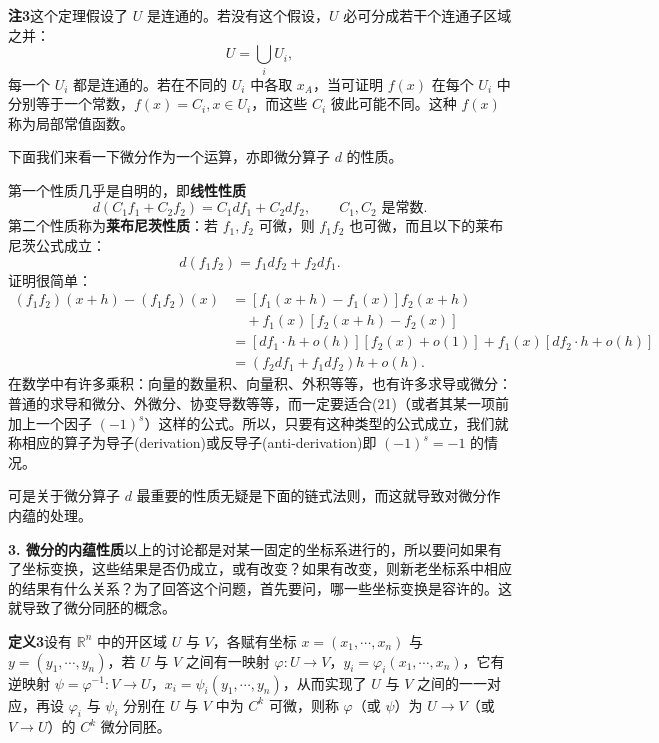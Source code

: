\noindent\textbf{注3}\quad 这个定理假设了 $U$ 是连通的。若没有这个假设，$U$ 必可分成若干个连通子区域之并：
\[
 U=\bigcup_i U_i,
\]
每一个 $U_i$ 都是连通的。若在不同的 $U_i$ 中各取 $x_A$，当可证明 $f(x)$ 在每个 $U_i$ 中分别等于一个常数，$f(x)=C_i,x\in U_i$，而这些 $C_i$ 彼此可能不同。这种 $f(x)$ 称为局部常值函数。

下面我们来看一下微分作为一个运算，亦即微分算子 $d$ 的性质。

第一个性质几乎是自明的，即\textbf{线性性质}
\begin{equation}
 d(C_1f_1+C_2f_2)=C_1df_1+C_2df_2,\qquad C_1,C_2\text{ 是常数}.
 \tag{20}
\end{equation}
第二个性质称为\textbf{莱布尼茨性质}：若 $f_1,f_2$ 可微，则 $f_1f_2$ 也可微，而且以下的莱布尼茨公式成立：
\begin{equation}
 d(f_1f_2)=f_1df_2+f_2df_1.
 \tag{21}
\end{equation}
证明很简单：
\begin{align*}
 (f_1f_2)(x+h)-(f_1f_2)(x)
 &= [f_1(x+h)-f_1(x)]f_2(x+h)\\
 &\quad+f_1(x)[f_2(x+h)-f_2(x)]\\
 &= [df_1\cdot h+o(h)][f_2(x)+o(1)]+f_1(x)[df_2\cdot h+o(h)]\\
 &= (f_2df_1+f_1df_2)h+o(h).
\end{align*}
在数学中有许多乘积：向量的数量积、向量积、外积等等，也有许多求导或微分：普通的求导和微分、外微分、协变导数等等，而一定要适合(21)（或者其某一项前加上一个因子 $(-1)^s$）这样的公式。所以，只要有这种类型的公式成立，我们就称相应的算子为导子(derivation)或反导子(anti-derivation)即 $(-1)^s=-1$ 的情况。

可是关于微分算子 $d$ 最重要的性质无疑是下面的链式法则，而这就导致对微分作内蕴的处理。

\noindent\textbf{3. 微分的内蕴性质}\quad 以上的讨论都是对某一固定的坐标系进行的，所以要问如果有了坐标变换，这些结果是否仍成立，或有改变？如果有改变，则新老坐标系中相应的结果有什么关系？为了回答这个问题，首先要问，哪一些坐标变换是容许的。这就导致了微分同胚的概念。

\noindent\textbf{定义3}\quad 设有 $\mathbb R^n$ 中的开区域 $U$ 与 $V$，各赋有坐标 $x=(x_1,\cdots,x_n)$ 与 $y=(y_1,\cdots,y_n)$，若 $U$ 与 $V$ 之间有一映射 $\varphi:U\to V$，$y_i=\varphi_i(x_1,\cdots,x_n)$，它有逆映射 $\psi=\varphi^{-1}:V\to U$，$x_i=\psi_i(y_1,\cdots,y_n)$，从而实现了 $U$ 与 $V$ 之间的一一对应，再设 $\varphi_i$ 与 $\psi_i$ 分别在 $U$ 与 $V$ 中为 $C^k$ 可微，则称 $\varphi$（或 $\psi$）为 $U\to V$（或 $V\to U$）的 $C^k$ 微分同胚。

